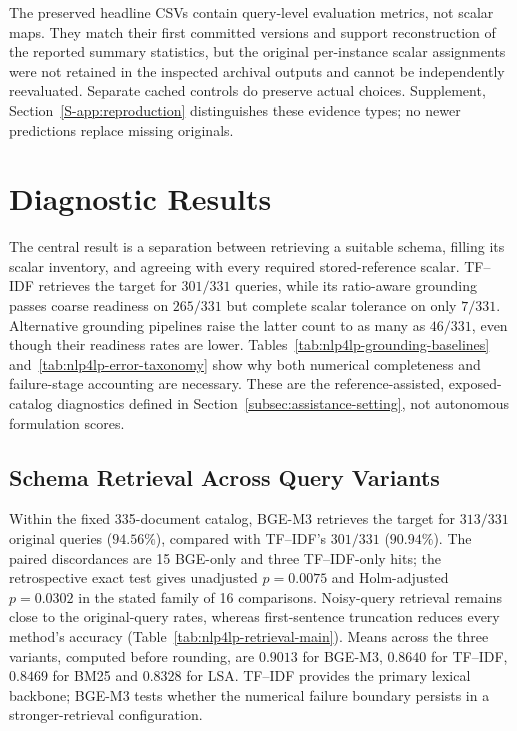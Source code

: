 \documentclass[pdflatex,sn-basic,Numbered]{sn-jnl}
\begin{document}
The preserved headline CSVs contain query-level evaluation metrics, not scalar maps. They match their first committed versions and support reconstruction of the reported summary statistics, but the original per-instance scalar assignments were not retained in the inspected archival outputs and cannot be independently reevaluated. Separate cached controls do preserve actual choices. Supplement, Section~\ref{S-app:reproduction} distinguishes these evidence types; no newer predictions replace missing originals.



\section{Diagnostic Results}
\label{sec:experiments}
The central result is a separation between retrieving a suitable schema, filling its scalar inventory, and agreeing with every required stored-reference scalar. TF--IDF retrieves the target for $301/331$ queries, while its ratio-aware grounding passes coarse readiness on $265/331$ but complete scalar tolerance on only $7/331$. Alternative grounding pipelines raise the latter count to as many as $46/331$, even though their readiness rates are lower. Tables~\ref{tab:nlp4lp-grounding-baselines} and~\ref{tab:nlp4lp-error-taxonomy} show why both numerical completeness and failure-stage accounting are necessary. These are the reference-assisted, exposed-catalog diagnostics defined in Section~\ref{subsec:assistance-setting}, not autonomous formulation scores.

\subsection{Schema Retrieval Across Query Variants}
\label{subsec:exp_retrieval}
Within the fixed 335-document catalog, BGE-M3 retrieves the target for $313/331$ original queries ($94.56\%$), compared with TF--IDF's $301/331$ ($90.94\%$). The paired discordances are 15 BGE-only and three TF--IDF-only hits; the retrospective exact test gives unadjusted $p=0.0075$ and Holm-adjusted $p=0.0302$ in the stated family of 16 comparisons. Noisy-query retrieval remains close to the original-query rates, whereas first-sentence truncation reduces every method's accuracy (Table~\ref{tab:nlp4lp-retrieval-main}). Means across the three variants, computed before rounding, are $0.9013$ for BGE-M3, $0.8640$ for TF--IDF, $0.8469$ for BM25 and $0.8328$ for LSA. TF--IDF provides the primary lexical backbone; BGE-M3 tests whether the numerical failure boundary persists in a stronger-retrieval configuration.
\end{document}
